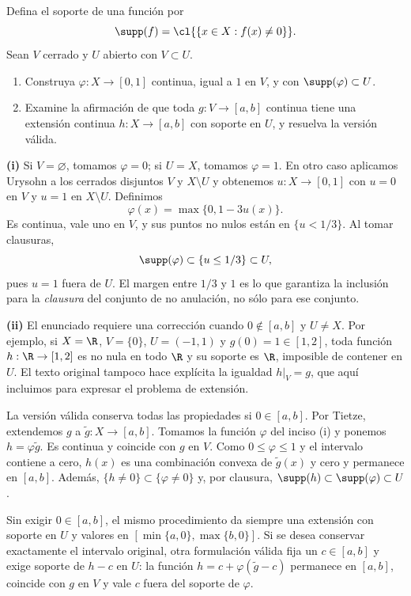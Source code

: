 \begin{ejercicio}\label{ej:lectura-12-2}\label{ch12:soporte}
Defina el soporte de una función por
\[
 \supp(f)=\cl{\{x\in X:f(x)\ne0\}}.
\]
Sean $V$ cerrado y $U$ abierto con $V\subset U$.
\begin{enumerate}[label=(\roman*)]
\item Construya $\varphi:X\to[0,1]$ continua, igual a $1$ en $V$, y con $\supp(\varphi)\subset U$.
\item Examine la afirmación de que toda $g:V\to[a,b]$ continua tiene una extensión continua $h:X\to[a,b]$ con soporte en $U$, y resuelva la versión válida.
\end{enumerate}
\end{ejercicio}
\begin{solucion}
\textbf{(i)} Si $V=\varnothing$, tomamos $\varphi=0$; si $U=X$, tomamos $\varphi=1$. En otro caso aplicamos Urysohn a los cerrados disjuntos $V$ y $X\setminus U$ y obtenemos $u:X\to[0,1]$ con $u=0$ en $V$ y $u=1$ en $X\setminus U$. Definimos
\[
 \varphi(x)=\max\{0,1-3u(x)\}.
\]
Es continua, vale uno en $V$, y sus puntos no nulos están en $\{u<1/3\}$. Al tomar clausuras,
\[
 \supp(\varphi)\subset\{u\leq1/3\}\subset U,
\]
pues $u=1$ fuera de $U$. El margen entre $1/3$ y $1$ es lo que garantiza la inclusión para la \emph{clausura} del conjunto de no anulación, no sólo para ese conjunto.

\textbf{(ii)} El enunciado requiere una corrección cuando $0\notin[a,b]$ y $U\ne X$. Por ejemplo, si $X=\R$, $V=\{0\}$, $U=(-1,1)$ y $g(0)=1\in[1,2]$, toda función $h:\R\to[1,2]$ es no nula en todo $\R$ y su soporte es $\R$, imposible de contener en $U$. El texto original tampoco hace explícita la igualdad $h|_V=g$, que aquí incluimos para expresar el problema de extensión.

La versión válida conserva todas las propiedades si $0\in[a,b]$. Por Tietze, extendemos $g$ a $\widetilde g:X\to[a,b]$. Tomamos la función $\varphi$ del inciso (i) y ponemos $h=\varphi\widetilde g$. Es continua y coincide con $g$ en $V$. Como $0\leq\varphi\leq1$ y el intervalo contiene a cero, $h(x)$ es una combinación convexa de $\widetilde g(x)$ y cero y permanece en $[a,b]$. Además, $\{h\ne0\}\subset\{\varphi\ne0\}$ y, por clausura, $\supp(h)\subset\supp(\varphi)\subset U$.

Sin exigir $0\in[a,b]$, el mismo procedimiento da siempre una extensión con soporte en $U$ y valores en $[\min\{a,0\},\max\{b,0\}]$. Si se desea conservar exactamente el intervalo original, otra formulación válida fija un $c\in[a,b]$ y exige soporte de $h-c$ en $U$: la función $h=c+\varphi(\widetilde g-c)$ permanece en $[a,b]$, coincide con $g$ en $V$ y vale $c$ fuera del soporte de $\varphi$.
\end{solucion}


